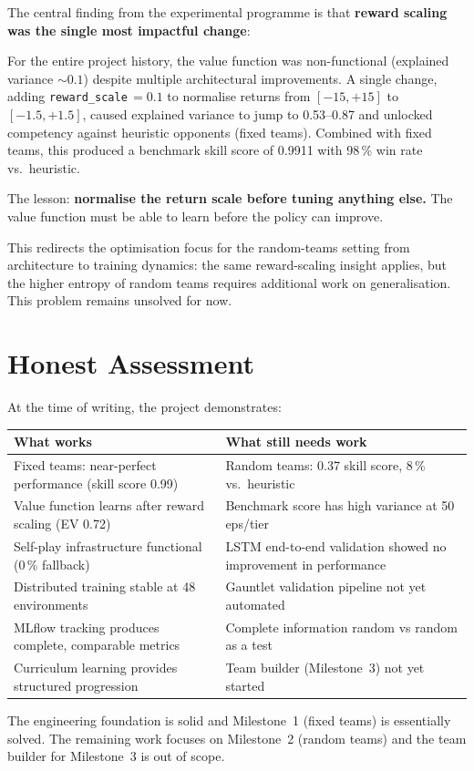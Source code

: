 The central finding from the experimental programme is that \textbf{reward
scaling was the single most impactful change}:

\begin{keyinsight}
For the entire project history, the value function was non-functional
(explained variance ${\sim}0.1$) despite multiple architectural improvements.
A single change, adding \texttt{reward\_scale}$\,=0.1$ to normalise returns
from $[-15,+15]$ to $[-1.5,+1.5]$, caused explained variance to jump to
0.53--0.87 and unlocked competency against heuristic opponents (fixed teams).  Combined with
fixed teams, this produced a benchmark skill score of 0.9911 with 98\,\% win
rate vs.\ heuristic.

The lesson: \textbf{normalise the return scale before tuning anything else.}
The value function must be able to learn before the policy can improve.
\end{keyinsight}

This redirects the optimisation focus for the random-teams setting from
architecture to training dynamics: the same reward-scaling insight applies,
but the higher entropy of random teams requires additional work on
generalisation. This problem remains unsolved for now.

\section{Honest Assessment}

At the time of writing, the project demonstrates:

\begin{center}
\small
\begin{tabularx}{\textwidth}{l X}
  \toprule
  \textbf{What works} & \textbf{What still needs work} \\
  \midrule
  Fixed teams: near-perfect performance (skill score 0.99) &
    Random teams: 0.37 skill score, 8\,\% vs.\ heuristic \\
  Value function learns after reward scaling (EV 0.72) &
    Benchmark score has high variance at 50 eps/tier \\
  Self-play infrastructure functional (0\,\% fallback) &
    LSTM end-to-end validation showed no improvement in performance \\
  Distributed training stable at 48 environments &
    Gauntlet validation pipeline not yet automated \\
  MLflow tracking produces complete, comparable metrics &
    Complete information random vs random as a test \\
  Curriculum learning provides structured progression &
    Team builder (Milestone~3) not yet started \\
  \bottomrule
\end{tabularx}
\end{center}

The engineering foundation is solid and Milestone~1 (fixed teams) is
essentially solved.  The remaining work focuses on Milestone~2 (random teams)
and the team builder for Milestone~3 is out of scope.
